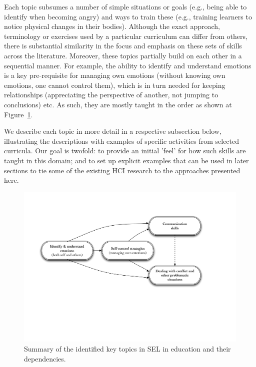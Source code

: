 \documentclass[prodmode,acmtochi]{acmsmall}
\newcommand{\GeraldineFIX}[1]{}
\begin{document}
Each topic subsumes a number of simple situations or goals (e.g., being able to identify when becoming angry) and ways to train these (e.g., training learners to notice physical changes in their bodies). 
Although the exact approach, terminology or exercises used by a particular curriculum can differ from others, there is substantial similarity in the focus and emphasis on these sets of skills across the literature.
Moreover, these topics partially build on each other in a sequential manner. For example, the ability to identify and understand emotions is a key pre-requisite for managing own emotions (without knowing own emotions, one cannot control them), which is in turn needed for keeping relationships (appreciating the perspective of another, not jumping to conclusions) etc. As such, they are mostly taught in the order as shown at Figure~\ref{fig:depfoc}. 

We  describe each topic in more detail in a respective subsection below, illustrating the descriptions with examples of specific activities from selected curricula. Our goal is twofold: to provide an initial 'feel' for how such skills are taught in this domain; and to set up explicit examples that can be used in later sections to tie some of the existing HCI research to the approaches presented here. 

\begin{figure}
  \centering
        \includegraphics[width=\columnwidth]{images/BuildingBlocks}
        \caption{Summary of the identified key topics in SEL in education and their dependencies.\GeraldineFIX{G: make clearer that this represents your summary of key topics and dependencied}}
        \label{fig:depfoc}
\end{figure}
\end{document}
